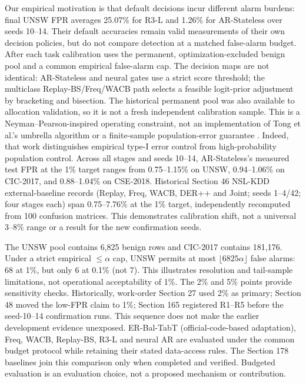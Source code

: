 \documentclass[10pt,twocolumn]{article}
\begin{document}
Our empirical motivation is that default decisions incur different alarm burdens: final UNSW FPR averages 25.07\% for R3-L and 1.26\% for AR-Stateless over seeds 10--14. Their default accuracies remain valid measurements of their own decision policies, but do not compare detection at a matched false-alarm budget. After each task calibration uses the permanent, optimization-excluded benign pool and a common empirical false-alarm cap. The decision maps are not identical: AR-Stateless and neural gates use a strict score threshold; the multiclass Replay-BS/Freq/WACB path selects a feasible logit-prior adjustment by bracketing and bisection. The historical permanent pool was also available to allocation validation, so it is not a fresh independent calibration sample. This is a Neyman--Pearson-inspired operating constraint, not an implementation of Tong et al.'s umbrella algorithm or a finite-sample population-error guarantee \cite{tong2018np}. Indeed, that work distinguishes empirical type-I error control from high-probability population control. Across all stages and seeds 10--14, AR-Stateless's measured test FPR at the 1\% target ranges from 0.75--1.15\% on UNSW, 0.94--1.06\% on CIC-2017, and 0.88--1.04\% on CSE-2018. Historical Section 46 NSL-KDD external-baseline records (Replay, Freq, WACB, DER++ and Joint; seeds 1--4/42; four stages each) span 0.75--7.76\% at the 1\% target, independently recomputed from 100 confusion matrices. This demonstrates calibration shift, not a universal 3--8\% range or a result for the new confirmation seeds.

The UNSW pool contains 6,825 benign rows and CIC-2017 contains 181,176. Under a strict empirical $\leq\alpha$ cap, UNSW permits at most $\lfloor6825\alpha\rfloor$ false alarms: 68 at 1\%, but only 6 at 0.1\% (not 7). This illustrates resolution and tail-sample limitations, not operational acceptability of 1\%. The 2\% and 5\% points provide sensitivity checks. Historically, work-order Section 27 used 2\% as primary; Section 48 moved the low-FPR claim to 1\%; Section 165 registered R1--R5 before the seed-10--14 confirmation runs. This sequence does not make the earlier development evidence unexposed. ER-Bal-TabT (official-code-based adaptation), Freq, WACB, Replay-BS, R3-L and neural AR are evaluated under the common budget protocol while retaining their stated data-access rules. The Section 178 baselines join this comparison only when completed and verified. Budgeted evaluation is an evaluation choice, not a proposed mechanism or contribution.
\end{document}
